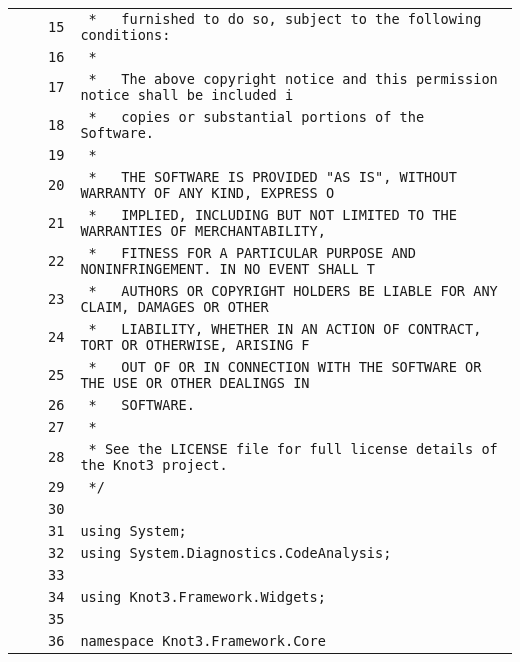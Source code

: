 \documentclass[a4paper,10pt]{article}
\begin{document}
\begin{longtable}[l]{lrrl}
\cellcolor{gray} &  & \verb~15~ & \verb~ *   furnished to do so, subject to the following conditions:~\\
\cellcolor{gray} &  & \verb~16~ & \verb~ *~\\
\cellcolor{gray} &  & \verb~17~ & \verb~ *   The above copyright notice and this permission notice shall be included i~\\
\cellcolor{gray} &  & \verb~18~ & \verb~ *   copies or substantial portions of the Software.~\\
\cellcolor{gray} &  & \verb~19~ & \verb~ *~\\
\cellcolor{gray} &  & \verb~20~ & \verb~ *   THE SOFTWARE IS PROVIDED "AS IS", WITHOUT WARRANTY OF ANY KIND, EXPRESS O~\\
\cellcolor{gray} &  & \verb~21~ & \verb~ *   IMPLIED, INCLUDING BUT NOT LIMITED TO THE WARRANTIES OF MERCHANTABILITY,~\\
\cellcolor{gray} &  & \verb~22~ & \verb~ *   FITNESS FOR A PARTICULAR PURPOSE AND NONINFRINGEMENT. IN NO EVENT SHALL T~\\
\cellcolor{gray} &  & \verb~23~ & \verb~ *   AUTHORS OR COPYRIGHT HOLDERS BE LIABLE FOR ANY CLAIM, DAMAGES OR OTHER~\\
\cellcolor{gray} &  & \verb~24~ & \verb~ *   LIABILITY, WHETHER IN AN ACTION OF CONTRACT, TORT OR OTHERWISE, ARISING F~\\
\cellcolor{gray} &  & \verb~25~ & \verb~ *   OUT OF OR IN CONNECTION WITH THE SOFTWARE OR THE USE OR OTHER DEALINGS IN~\\
\cellcolor{gray} &  & \verb~26~ & \verb~ *   SOFTWARE.~\\
\cellcolor{gray} &  & \verb~27~ & \verb~ *~\\
\cellcolor{gray} &  & \verb~28~ & \verb~ * See the LICENSE file for full license details of the Knot3 project.~\\
\cellcolor{gray} &  & \verb~29~ & \verb~ */~\\
\cellcolor{gray} &  & \verb~30~ & \verb~~\\
\cellcolor{gray} &  & \verb~31~ & \verb~using System;~\\
\cellcolor{gray} &  & \verb~32~ & \verb~using System.Diagnostics.CodeAnalysis;~\\
\cellcolor{gray} &  & \verb~33~ & \verb~~\\
\cellcolor{gray} &  & \verb~34~ & \verb~using Knot3.Framework.Widgets;~\\
\cellcolor{gray} &  & \verb~35~ & \verb~~\\
\cellcolor{gray} &  & \verb~36~ & \verb~namespace Knot3.Framework.Core~\\

\end{longtable}
\end{document}
